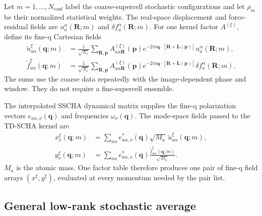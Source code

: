 \documentclass{article}
\newcommand{\Nc}{N_c}
\begin{document}
Let $m=1,\ldots,N_{\mathrm{conf}}$ label the coarse-supercell stochastic
configurations and let $\rho_m$ be their normalized statistical weights.
The real-space displacement and force-residual fields are
$u_a^\alpha(\bm R;m)$ and $\delta f_a^\alpha(\bm R;m)$. For one kernel
factor $A^{(\xi)}$, define its fine-q Cartesian fields
\begin{align}
    \widetilde u_{a\alpha}^{\xi}(\bm q;m)
    &=
    \frac{1}{\sqrt{\Nc}}
    \sum_{\bm R,\bm p}
    A_{a\alpha\bm R}^{(\xi)}(\bm p)
    e^{-2\pi i\bm q\cdot[\bm R+\bm L(\bm p)]}
    u_a^\alpha(\bm R;m),
    \label{eq:fine-windowed-u}\\
    \widetilde f_{a\alpha}^{\xi}(\bm q;m)
    &=
    \frac{1}{\sqrt{\Nc}}
    \sum_{\bm R,\bm p}
    A_{a\alpha\bm R}^{(\xi)}(\bm p)
    e^{-2\pi i\bm q\cdot[\bm R+\bm L(\bm p)]}
    \delta f_a^\alpha(\bm R;m).
    \label{eq:fine-windowed-f}
\end{align}
The sums use the coarse data repeatedly with the image-dependent phase and
window. They do not require a fine-supercell ensemble.

The interpolated SSCHA dynamical matrix supplies the fine-q polarization
vectors $e_{a\alpha,\nu}(\bm q)$ and frequencies $\omega_\nu(\bm q)$. The
mode-space fields passed to the TD-SCHA kernel are
\begin{align}
    x_{\nu}^{\xi}(\bm q;m)
    &=
    \sum_{a\alpha}
    e_{a\alpha,\nu}^{*}(\bm q)
    \sqrt{M_a}\,
    \widetilde u_{a\alpha}^{\xi}(\bm q;m),
    \label{eq:fine-mode-x}\\
    y_{\nu}^{\xi}(\bm q;m)
    &=
    \sum_{a\alpha}
    e_{a\alpha,\nu}^{*}(\bm q)
    \frac{\widetilde f_{a\alpha}^{\xi}(\bm q;m)}{\sqrt{M_a}}.
    \label{eq:fine-mode-y}
\end{align}
$M_a$ is the atomic mass. One factor table therefore produces one pair of
fine-q field arrays $(x^\xi,y^\xi)$, evaluated at every momentum needed by
the pair list.

\subsection{General low-rank stochastic average}
\label{sec:general-fine-average}
\end{document}
